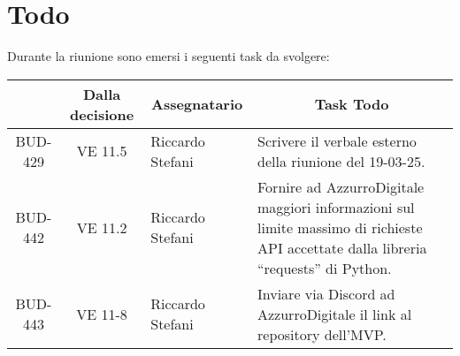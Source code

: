 

\section{Todo}

Durante la riunione sono emersi i seguenti task da svolgere:

\vspace{0.5cm}

\begin{table}[htbp]
\centering
{}
\begin{tabular}{|c|c|p{}|p{}|}
    \hline
    \rowcolor[gray]{0.75}
    \multicolumn{1}{|c|}{\textbf{Codice}} & \multicolumn{1}{|c|}{\textbf{Dalla decisione}} & \multicolumn{1}{|c|}{\textbf{Assegnatario}} & \multicolumn{1}{|c|}{\textbf{Task Todo}} \\
    \hline
    BUD-429 & VE 11.5 & Riccardo Stefani & Scrivere il verbale esterno della riunione del 19-03-25.\\
    \hline
    BUD-442 & VE 11.2 & Riccardo Stefani & Fornire ad AzzurroDigitale maggiori informazioni sul limite massimo di richieste
    API accettate dalla libreria “requests” di Python.\\
    \hline
    BUD-443 & VE 11-8 & Riccardo Stefani & Inviare via Discord ad AzzurroDigitale il link al repository dell’MVP.\\
    \hline
\end{tabular}
\end{table}


